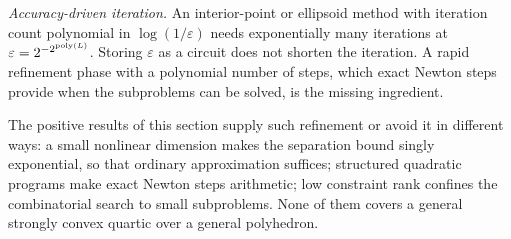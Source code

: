 \emph{Accuracy-driven iteration.} An interior-point or ellipsoid method with
iteration count polynomial in $\log(1/\varepsilon)$ needs exponentially many
iterations at $\varepsilon=2^{-2^{\operatorname{poly}(L)}}$. Storing $\varepsilon$ as a circuit
does not shorten the iteration. A rapid refinement phase with a polynomial
number of steps, which exact Newton steps provide when the subproblems can be
solved, is the missing ingredient.

The positive results of this section supply such refinement or avoid it in
different ways: a small nonlinear dimension makes the separation bound singly
exponential, so that ordinary approximation suffices; structured quadratic
programs make exact Newton steps arithmetic; low constraint rank confines the
combinatorial search to small subproblems. None of them covers a general
strongly convex quartic over a general polyhedron.
